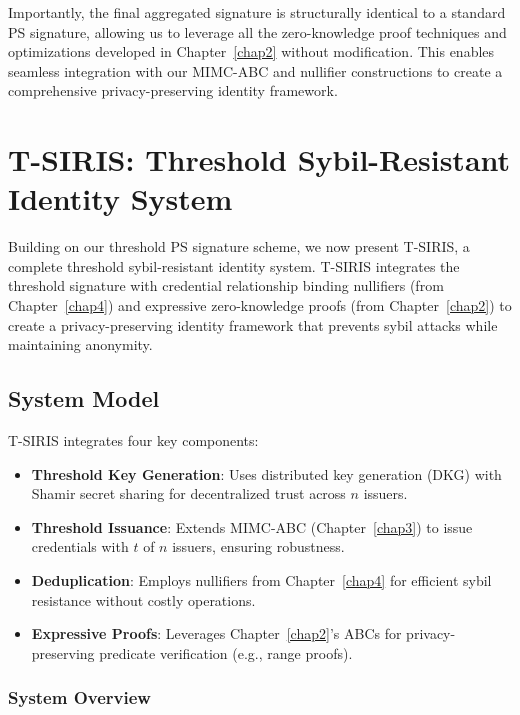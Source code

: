Importantly, the final aggregated signature is structurally identical to a standard PS signature, allowing us to leverage all the zero-knowledge proof techniques and optimizations developed in Chapter~\ref{chap2} without modification. This enables seamless integration with our MIMC-ABC and nullifier constructions to create a comprehensive privacy-preserving identity framework.










\section{T-SIRIS: Threshold Sybil-Resistant Identity System}
\label{sec:tsiris}

Building on our threshold PS signature scheme, we now present T-SIRIS, a complete threshold sybil-resistant identity system. T-SIRIS integrates the threshold signature with credential relationship binding nullifiers (from Chapter~\ref{chap4}) and expressive zero-knowledge proofs (from Chapter~\ref{chap2}) to create a privacy-preserving identity framework that prevents sybil attacks while maintaining anonymity.

\subsection{System Model}

T-SIRIS integrates four key components:
\begin{itemize}
    \item \textbf{Threshold Key Generation}: Uses distributed key generation (DKG) with Shamir secret sharing for decentralized trust across $n$ issuers.
    \item \textbf{Threshold Issuance}: Extends MIMC-ABC (Chapter~\ref{chap3}) to issue credentials with $t$ of $n$ issuers, ensuring robustness.
    \item \textbf{Deduplication}: Employs nullifiers from Chapter~\ref{chap4} for efficient sybil resistance without costly operations.
    \item \textbf{Expressive Proofs}: Leverages Chapter~\ref{chap2}'s ABCs for privacy-preserving predicate verification (e.g., range proofs).
\end{itemize}



\subsubsection{System Overview}






